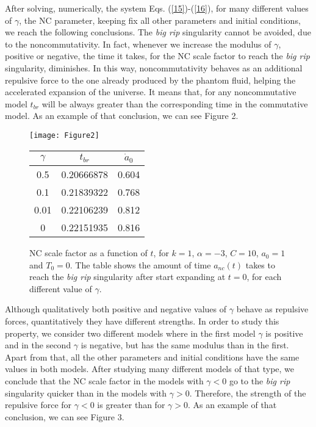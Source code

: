 \documentclass[12pt]{article}
\newcommand{\0}{{(0)}}
\newcommand{\1}{{(1)}}
\newcommand{\2}{{(2)}}
\begin{document}
{After solving, numerically, the system Eqs. (\ref{15})-(\ref{16}), for many different values of $\gamma$, the NC parameter, 
keeping fix all other parameters and initial conditions, we reach the following conclusions. The {\it big rip} singularity 
cannot be avoided, due to the noncommutativity. In fact, whenever we increase the modulus of $\gamma$, positive or negative,
the time it takes, for the NC scale factor to reach the {\it big rip} singularity, diminishes. In this way, noncommutativity 
behaves as an additional repulsive force to the one already produced by the phantom fluid, helping the accelerated expansion 
of the universe. It means that, for any noncommutative model $t_{br}$ will be always greater than the corresponding time in the
commutative model. As an example of that conclusion, we can see Figure 2.

\begin{figure}[!htb]
	\centering
	\begin{minipage}[c]{0.49\linewidth}
		\centering
		\texttt{[image: Figure2]}
	\end{minipage}
	\hfill
	\begin{minipage}[c]{0.49\linewidth}
		\centering
		\begin{tabular}{ccc}\hline
			$\gamma$ & $t_{br}$ & $\dot{a}_0$ \\ \hline
			0.5 & 0.20666878 & 0.604 \\
			0.1 & 0.21839322 & 0.768 \\
			0.01 & 0.22106239 & 0.812 \\
			0 & 0.22151935 & 0.816 \\ \hline
		\end{tabular}
	\end{minipage}
		\caption{NC scale factor as a function of $t$, for $k = 1$, $\alpha = -3$, $C = 10$, $a_0 = 1$ and $T_0 = 0$.
		The table shows the amount of time $a_{nc}(t)$ takes to reach the {\it big rip} singularity after start expanding at $t=0$, 
		for each different value of $\gamma$.}\label{fig2}
\end{figure}

Although qualitatively both positive and negative values of $\gamma$ behave as repulsive forces, quantitatively they have different
strengths. In order to study this property, we consider two different models where in the first model $\gamma$ is positive and in the 
second $\gamma$ is negative, but has the same modulus than in the first. Apart from that, all the other parameters and initial conditions 
have the same values in both models. After studying many different models of that type, we conclude that the NC scale factor in the models 
with $\gamma < 0$ go to the {\it big rip} singularity quicker than in the models with $\gamma > 0$. Therefore, the strength of the repulsive
force for $\gamma < 0$ is greater than for $\gamma > 0$. As an example of that conclusion, we can see Figure 3.

}
\end{document}
